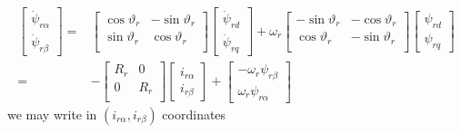 \documentclass[11pt,a4paper,oneside]{book}
\numberwithin{equation}{section}
\theoremstyle{it}
\theoremstyle{definition}
\begin{document}
\begin{equation} \label{eq36}
	\begin{split}
		\left[
		\begin{matrix}
			\dot{\psi}_{r\alpha} \\[6pt]
			\dot{\psi}_{r\beta}
		\end{matrix} \right] = &
		\left[
		\begin{matrix}
			\cos\vartheta_r & -\sin\vartheta_r \\[6pt]
			\sin\vartheta_r & \cos\vartheta_r \\[6pt]
		\end{matrix} \right]
		\left[
		\begin{matrix}
			\dot{\psi}_{rd} \\[6pt]
			\dot{\psi}_{rq}
		\end{matrix} \right] + \omega_r
		\left[
		\begin{matrix}
			-\sin\vartheta_r & -\cos\vartheta_r \\[6pt]
			\cos\vartheta_r & -\sin\vartheta_r \\[6pt]
		\end{matrix} \right]
		\left[
		\begin{matrix}
			\psi_{rd} \\[6pt]
			\psi_{rq}
		\end{matrix} \right] \\[6pt]
		= & -
		\left[
		\begin{matrix}
			R_r & 0 \\[6pt]
			0 & R_r \\[6pt]
		\end{matrix} \right]
		\left[
		\begin{matrix}
			i_{r\alpha} \\[6pt]
			i_{r\beta}
		\end{matrix} \right] + 
		\left[
		\begin{matrix}
			-\omega_r{\psi}_{r\beta} \\[6pt]
			\omega_r{\psi}_{r\alpha}
		\end{matrix} \right]
	\end{split}
\end{equation}
we may write in $(i_{r\alpha}, i_{r\beta})$ coordinates
\end{document}
